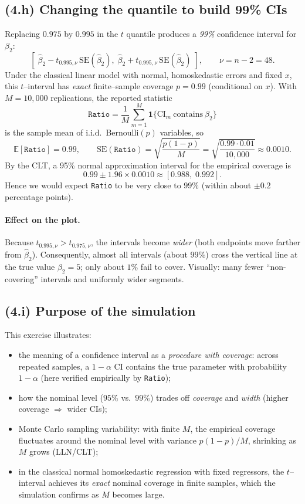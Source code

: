 \subsection*{(4.h) Changing the quantile to build 99\% CIs}

Replacing $0.975$ by $0.995$ in the $t$ quantile produces a \emph{99\%} confidence
interval for $\beta_2$:
\[
\left[\;\widehat\beta_2 - t_{0.995,\nu}\,\mathrm{SE}(\widehat\beta_2),\;
       \widehat\beta_2 + t_{0.995,\nu}\,\mathrm{SE}(\widehat\beta_2)\;\right],
\qquad \nu = n-2 = 48 .
\]
Under the classical linear model with normal, homoskedastic errors and fixed $x$,
this $t$–interval has \emph{exact} finite–sample coverage $p=0.99$ (conditional on $x$).
With $M=10{,}000$ replications, the reported statistic
\[
\texttt{Ratio}=\frac{1}{M}\sum_{m=1}^{M}\mathbf{1}\{\text{CI}_m\ \text{contains}\ \beta_2\}
\]
is the sample mean of i.i.d.\ Bernoulli$(p)$ variables, so
\[
\mathbb{E}[\texttt{Ratio}]=0.99,\qquad
\mathrm{SE}(\texttt{Ratio})=\sqrt{\frac{p(1-p)}{M}}
=\sqrt{\frac{0.99\cdot0.01}{10{,}000}}\approx 0.0010 .
\]
By the CLT, a 95\% normal approximation interval for the empirical coverage is
\[
0.99 \pm 1.96\times 0.0010 \approx [0.988,\;0.992].
\]
Hence we would expect \texttt{Ratio} to be very close to $99\%$ (within about $\pm0.2$ percentage points).

\paragraph{Effect on the plot.}
Because $t_{0.995,\nu}>t_{0.975,\nu}$, the intervals become \emph{wider} (both endpoints move farther from
$\widehat\beta_2$). Consequently, almost all intervals (about $99\%$) cross the vertical line at the true value
$\beta_2=5$; only about $1\%$ fail to cover. Visually: many fewer “non-covering” intervals and uniformly wider
segments.

\subsection*{(4.i) Purpose of the simulation}

This exercise illustrates:
\begin{itemize}
  \item the meaning of a confidence interval as a \emph{procedure with coverage}: across repeated samples,
        a $1-\alpha$ CI contains the true parameter with probability $1-\alpha$ (here verified empirically by \texttt{Ratio});
  \item how the nominal level ($95\%$ vs.\ $99\%$) trades off \emph{coverage} and \emph{width} (higher coverage $\Rightarrow$ wider CIs);
  \item Monte Carlo sampling variability: with finite $M$, the empirical coverage fluctuates around the nominal level with
        variance $p(1-p)/M$, shrinking as $M$ grows (LLN/CLT);
  \item in the classical normal homoskedastic regression with fixed regressors, the $t$–interval achieves
        its \emph{exact} nominal coverage in finite samples, which the simulation confirms as $M$ becomes large.
\end{itemize}
